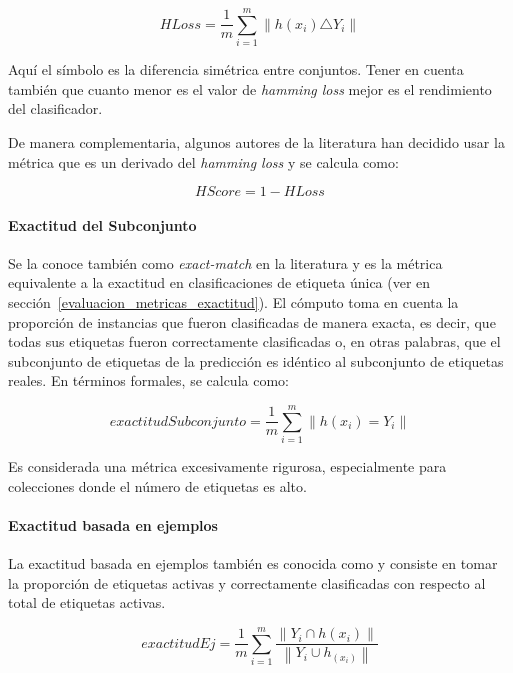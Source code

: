 \begin{equation}
	HLoss = \frac{1}{m} \sum_{i=1}^{m} \left\|h(x_{i}) \triangle Y_{i}\right\|
\end{equation}

Aquí el símbolo \comillas{$\triangle$} es la diferencia simétrica entre
conjuntos. Tener en cuenta también que cuanto menor es el valor de
\textit{hamming loss} mejor es el rendimiento del clasificador.

De manera complementaria, algunos autores de la literatura han decidido usar la
métrica  que es un derivado del \textit{hamming
	loss} y se calcula como:

\begin{equation}
	HScore = 1 - HLoss
\end{equation}

\paragraph{Exactitud del Subconjunto} Se la conoce también como
\textit{exact-match} en la literatura y es la métrica equivalente a la exactitud
en clasificaciones de etiqueta única (ver  en
sección~\ref{evaluacion_metricas_exactitud}). El cómputo toma en cuenta la
proporción de instancias que fueron clasificadas de manera exacta, es decir, que
todas sus etiquetas fueron correctamente clasificadas o, en otras palabras, que
el subconjunto de etiquetas de la predicción es idéntico al subconjunto de
etiquetas reales. En términos formales, se calcula como:

\begin{equation}
	exactitudSubconjunto = \frac{1}{m} \sum_{i=1}^{m} \left\|h(x_{i}) =
	Y_{i}\right\|
\end{equation}

Es considerada una métrica excesivamente rigurosa, especialmente para
colecciones donde el número de etiquetas es alto.

\paragraph{Exactitud basada en ejemplos}

La exactitud basada en ejemplos también es conocida como  y consiste en tomar la proporción de etiquetas activas y correctamente
clasificadas con respecto al total de etiquetas activas.

\begin{equation}
	exactitudEj = \frac{1}{m} \sum_{i=1}^{m}
	\frac{\left\|Y_{i} \cap h(x_{i})\right\|}
	{\left\|Y_{i} \cup h_(x_{i})\right\|}
\end{equation}


